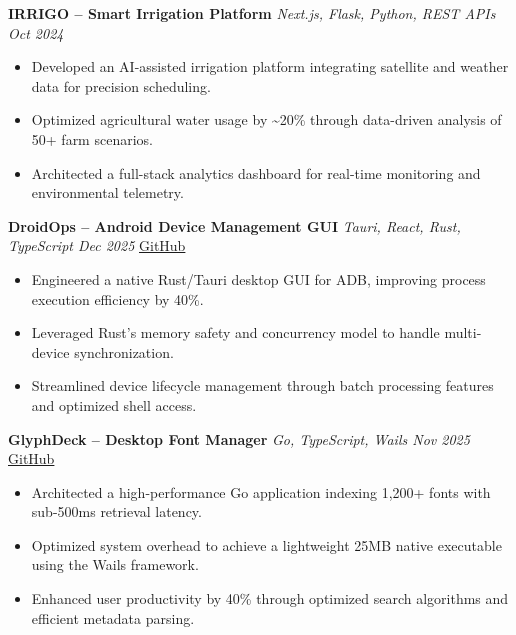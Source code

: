\documentclass[10pt, a4paper]{article}
\begin{document}
\vspace{1.5pt}

\textbf{IRRIGO -- Smart Irrigation Platform} \hfill \textit{Next.js, Flask, Python, REST APIs \quad Oct 2024}
\begin{itemize}
\item Developed an AI-assisted irrigation platform integrating satellite and weather data for precision scheduling.
\item Optimized agricultural water usage by \textasciitilde20\% through data-driven analysis of 50+ farm scenarios.
\item Architected a full-stack analytics dashboard for real-time monitoring and environmental telemetry.
\end{itemize}

\vspace{1.5pt}

\textbf{DroidOps -- Android Device Management GUI} \hfill \textit{Tauri, React, Rust, TypeScript \quad Dec 2025} \quad \href{https://github.com/bbinxx/droidops}{GitHub}
\begin{itemize}
\item Engineered a native Rust/Tauri desktop GUI for ADB, improving process execution efficiency by 40\%.
\item Leveraged Rust's memory safety and concurrency model to handle multi-device synchronization.
\item Streamlined device lifecycle management through batch processing features and optimized shell access.
\end{itemize}

\vspace{3pt}

\textbf{GlyphDeck -- Desktop Font Manager} \hfill \textit{Go, TypeScript, Wails \quad Nov 2025} \quad \href{https://github.com/bbinxx/GlyphDeck}{GitHub}
\begin{itemize}
\item Architected a high-performance Go application indexing 1,200+ fonts with sub-500ms retrieval latency.
\item Optimized system overhead to achieve a lightweight 25MB native executable using the Wails framework.
\item Enhanced user productivity by 40\% through optimized search algorithms and efficient metadata parsing.
\end{itemize}

\end{document}
